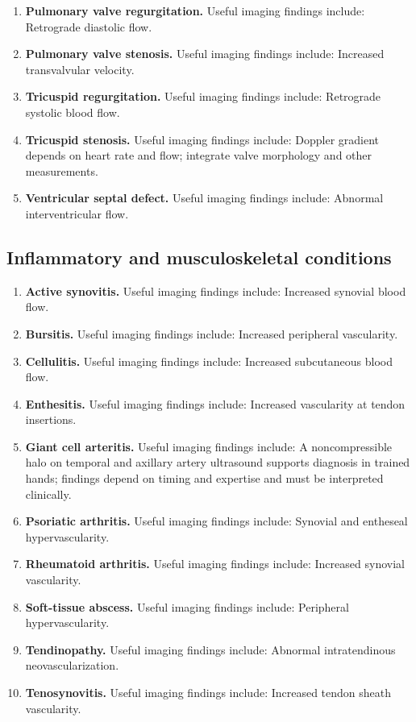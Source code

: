 \begin{enumerate}[leftmargin=*,itemsep=0.45em,topsep=0.4em]
\item \textbf{Pulmonary valve regurgitation.} Useful imaging findings include: Retrograde diastolic flow.
\item \textbf{Pulmonary valve stenosis.} Useful imaging findings include: Increased transvalvular velocity.
\item \textbf{Tricuspid regurgitation.} Useful imaging findings include: Retrograde systolic blood flow.
\item \textbf{Tricuspid stenosis.} Useful imaging findings include: Doppler gradient depends on heart rate and flow; integrate valve morphology and other measurements.
\item \textbf{Ventricular septal defect.} Useful imaging findings include: Abnormal interventricular flow.
\end{enumerate}

\subsection{Inflammatory and musculoskeletal conditions}
\begin{enumerate}[leftmargin=*,itemsep=0.45em,topsep=0.4em]
\item \textbf{Active synovitis.} Useful imaging findings include: Increased synovial blood flow.
\item \textbf{Bursitis.} Useful imaging findings include: Increased peripheral vascularity.
\item \textbf{Cellulitis.} Useful imaging findings include: Increased subcutaneous blood flow.
\item \textbf{Enthesitis.} Useful imaging findings include: Increased vascularity at tendon insertions.
\item \textbf{Giant cell arteritis.} Useful imaging findings include: A noncompressible halo on temporal and axillary artery ultrasound supports diagnosis in trained hands; findings depend on timing and expertise and must be interpreted clinically.
\item \textbf{Psoriatic arthritis.} Useful imaging findings include: Synovial and entheseal hypervascularity.
\item \textbf{Rheumatoid arthritis.} Useful imaging findings include: Increased synovial vascularity.
\item \textbf{Soft-tissue abscess.} Useful imaging findings include: Peripheral hypervascularity.
\item \textbf{Tendinopathy.} Useful imaging findings include: Abnormal intratendinous neovascularization.
\item \textbf{Tenosynovitis.} Useful imaging findings include: Increased tendon sheath vascularity.
\end{enumerate}

